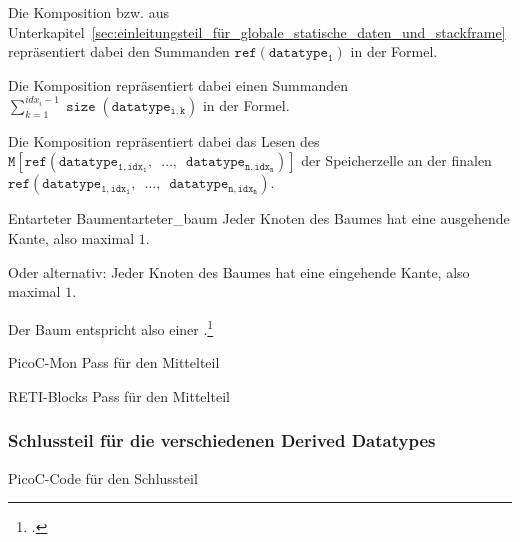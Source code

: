 \begin{Special_Paragraph}
  Die Komposition  bzw.  aus Unterkapitel~\ref{sec:einleitungsteil_für_globale_statische_daten_und_stackframe} repräsentiert dabei den Summanden $\mathtt{ref(datatype_1)}$ in der Formel.

  Die Komposition  repräsentiert dabei einen Summanden $\sum_{k=1}^{idx_i - 1} \mathtt{\operatorname{size}(datatype_{i, k})}$ in der Formel.

Die Komposition  repräsentiert dabei das Lesen des  $\mathtt{M\left[ref(datatype_{1, idx_1},\enspace\ldots,\enspace datatype_{n, idx_n})\right]}$ der Speicherzelle an der finalen  $\mathtt{ref(datatype_{1, idx_1},\enspace\ldots,\enspace datatype_{n, idx_n})}$.
\end{Special_Paragraph}

\begin{Definition}{Entarteter Baum}{entarteter_baum}
  Jeder Knoten des Baumes hat  eine ausgehende Kante, also maximal  $1$.

  \textnormal{Oder alternativ:} Jeder Knoten des Baumes hat  eine eingehende Kante, also maximal  $1$.

  Der Baum entspricht also einer .\footcite{noauthor_baume_nodate}
\end{Definition}

\begin{code}
  \centering
  \caption{PicoC-Mon Pass für den Mittelteil}
  \label{code:picoc_mon_pass_mittelteil}
\end{code}

\begin{code}
  \centering
  \caption{RETI-Blocks Pass für den Mittelteil}
  \label{code:reti_blocks_pass_mittelteil}
\end{code}

\subsubsection{Schlussteil für die verschiedenen Derived Datatypes}
\label{sec:schlussteil_für_die_verschiedenen_derived_datatypes}
\begin{code}
  \centering
  \caption{PicoC-Code für den Schlussteil}
  \label{code:picoc_code_schlussteil}
\end{code}

